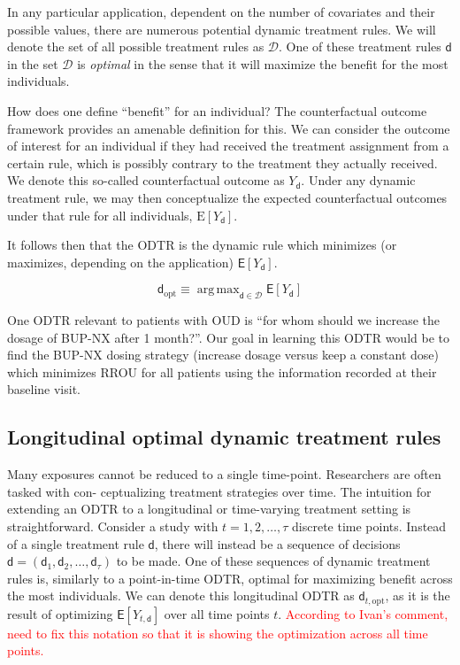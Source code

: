 \documentclass[11pt]{article}
\DeclareMathOperator*{\argmax}{arg\,max}
\renewcommand{\d}{\mathsf{d}}
\newcommand{\E}{\mathsf{E}}
\begin{document}
	In any particular application, dependent on the number of covariates and their possible values, there are numerous potential dynamic treatment rules. We will denote the set of all possible treatment rules as $\mathcal{D}$. One of these treatment rules $\d$ in the set $\mathcal{D}$ is \emph{optimal} in the sense that it will maximize the benefit for the most individuals.
	
	How does one define ``benefit'' for an individual? The counterfactual outcome framework provides an amenable definition for this. We can consider the outcome of interest for an individual if they had received the treatment assignment from a certain rule, which is possibly contrary to the treatment they actually received. We denote this so-called counterfactual outcome as $Y_\d$. Under any dynamic treatment rule, we may then conceptualize the expected counterfactual outcomes under that rule for all individuals, $\mathrm{E}[Y_\d]$.
	
	It follows then that the ODTR is the dynamic rule which minimizes (or maximizes, depending on the application) $\E[Y_\d]$.
	
	$$
	\d_{\text{opt}} \equiv \argmax_{\d \in \mathcal{D}} \E [Y_{\d}]
	$$
	
	One ODTR relevant to patients with OUD is ``for whom should we increase the dosage of BUP-NX after 1 month?''. Our goal in learning this ODTR would be to find the BUP-NX dosing strategy (increase dosage versus keep a constant dose) which minimizes RROU for all patients using the information recorded at their baseline visit.	

	\subsection{Longitudinal optimal dynamic treatment rules} 
	
	Many exposures cannot be reduced to a single time-point. Researchers are often tasked with con- ceptualizing treatment strategies over time. The intuition for extending an ODTR to a longitudinal or time-varying treatment setting is straightforward. Consider a study with $t = 1, 2 , \dots, \tau$ discrete time points. Instead of a single treatment rule $\d$, there will instead be a sequence of decisions $\d = (\d_1, \d_2, \dots, \d_\tau)$ to be made. One of these sequences of dynamic treatment rules is, similarly to a point-in-time ODTR, optimal for maximizing benefit across the most individuals. We can denote this longitudinal ODTR as $\d_{t,\text{opt}}$, as it is the result of optimizing $\E [Y_{t,\d}]$ over all time points $t$. \textcolor{red}{According to Ivan's comment, need to fix this notation so that it is showing the optimization across all time points.}
	
\end{document}
